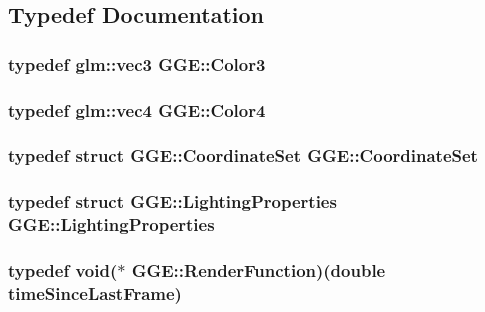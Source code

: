 \subsection{Typedef Documentation}
\hypertarget{namespace_g_g_e_ae2829723f010eeffbb96282f99792546}{
\subsubsection[{Color3}]{\setlength{\rightskip}{0pt plus 5cm}typedef glm\+::vec3 {\bf G\+G\+E\+::\+Color3}}}\label{namespace_g_g_e_ae2829723f010eeffbb96282f99792546}
\hypertarget{namespace_g_g_e_aff43741fd756c83cbfd5d4d5cd9fcf41}{
\subsubsection[{Color4}]{\setlength{\rightskip}{0pt plus 5cm}typedef glm\+::vec4 {\bf G\+G\+E\+::\+Color4}}}\label{namespace_g_g_e_aff43741fd756c83cbfd5d4d5cd9fcf41}
\hypertarget{namespace_g_g_e_a7e11417ae8ffddb46f0338f25ebf2051}{
\subsubsection[{Coordinate\+Set}]{\setlength{\rightskip}{0pt plus 5cm}typedef struct {\bf G\+G\+E\+::\+Coordinate\+Set}  {\bf G\+G\+E\+::\+Coordinate\+Set}}}\label{namespace_g_g_e_a7e11417ae8ffddb46f0338f25ebf2051}
\hypertarget{namespace_g_g_e_a3cb8bb0b982d877997c93103c48e2592}{
\subsubsection[{Lighting\+Properties}]{\setlength{\rightskip}{0pt plus 5cm}typedef struct {\bf G\+G\+E\+::\+Lighting\+Properties}  {\bf G\+G\+E\+::\+Lighting\+Properties}}}\label{namespace_g_g_e_a3cb8bb0b982d877997c93103c48e2592}
\hypertarget{namespace_g_g_e_ae2d6bfdcdfc2e210b6d827b4221a9dc4}{
\subsubsection[{Render\+Function}]{\setlength{\rightskip}{0pt plus 5cm}typedef void($\ast$ G\+G\+E\+::\+Render\+Function)(double time\+Since\+Last\+Frame)}}\label{namespace_g_g_e_ae2d6bfdcdfc2e210b6d827b4221a9dc4}
